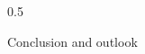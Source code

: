\documentclass[dvipdfmx]{beamer}
\begin{document}
\begin{frame}[fragile]
\begin{columns}[t]
\begin{column}{0.5\linewidth}
\begin{mybox}{Conclusion and outlook}
        \end{mybox}
                
    \end{column}
\end{columns}
\end{frame}
\end{document}

